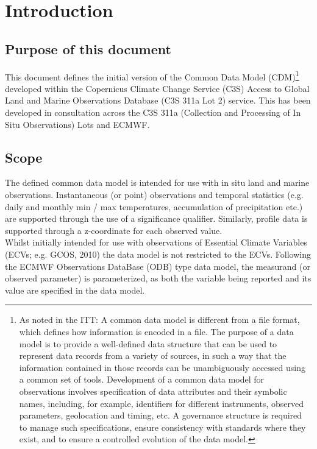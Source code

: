 \documentclass[a4paper,11pt]{article}
\begin{document}
\newpage
\tableofcontents
\newpage
\listoftables
\newpage


\section {Introduction}

\subsection {Purpose of this document}
This document defines the initial version of the Common Data Model (CDM)\footnote{As noted in the ITT: A common data model is different from a file format, which defines how information is encoded in a file. The purpose of a data model is to provide a well-defined data structure that can be used to represent data records from a variety of sources, in such a way that the information contained in those records can be unambiguously accessed using a common set of tools. Development of a common data model for observations involves specification of data attributes and their symbolic names, including, for example, identifiers for different instruments, observed parameters, geolocation and timing, etc. A governance structure is required to manage such specifications, ensure consistency with standards where they exist, and to ensure a controlled evolution of the data model.} developed within the Copernicus Climate Change Service (C3S) Access to Global Land and Marine Observations Database (C3S 311a Lot 2) service. This has been developed in consultation across the C3S 311a (Collection and Processing of In Situ Observations) Lots and ECMWF.

\subsection {Scope}
The defined common data model is intended for use with in situ land and marine observations. Instantaneous (or point) observations and temporal statistics (e.g. daily and monthly min / max temperatures, accumulation of precipitation etc.)  are supported through the use of a significance qualifier. Similarly, profile data is supported through a z-coordinate for each observed value.\\

Whilst initially intended for use with observations of Essential Climate Variables (ECVs; e.g. GCOS, 2010) the data model is not restricted to the ECVs. Following the ECMWF Observations DataBase (ODB) type data model, the measurand (or observed parameter) is parameterized, as both the variable being reported and its value are specified in the data model.\\
\end{document}

